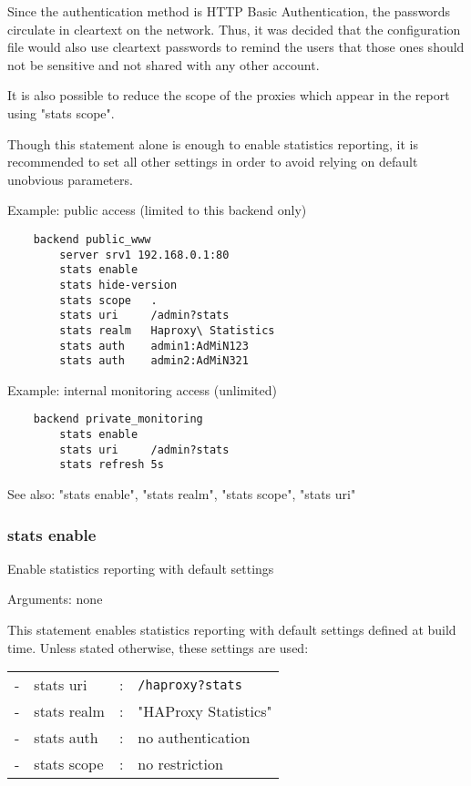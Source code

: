   Since the authentication method is HTTP Basic Authentication, the passwords
  circulate in cleartext on the network. Thus, it was decided that the
  configuration file would also use cleartext passwords to remind the users
  that those ones should not be sensitive and not shared with any other account.

  It is also possible to reduce the scope of the proxies which appear in the
  report using "stats scope".

  Though this statement alone is enough to enable statistics reporting, it is
  recommended to set all other settings in order to avoid relying on default
  unobvious parameters.

  Example: public access (limited to this backend only)
  \begin{verbatim}
    backend public_www
        server srv1 192.168.0.1:80
        stats enable
        stats hide-version
        stats scope   .
        stats uri     /admin?stats
        stats realm   Haproxy\ Statistics
        stats auth    admin1:AdMiN123
        stats auth    admin2:AdMiN321
   \end{verbatim}

   Example: internal monitoring access (unlimited)
   \begin{verbatim}
    backend private_monitoring
        stats enable
        stats uri     /admin?stats
        stats refresh 5s
   \end{verbatim}

  See also: "stats enable", "stats realm", "stats scope", "stats uri"

\subsubsection{stats enable}


  Enable statistics reporting with default settings


  Arguments: none

  This statement enables statistics reporting with default settings defined
  at build time. Unless stated otherwise, these settings are used:
  
  \begin{tabular}{llll}
  - & stats uri   & : & \verb|/haproxy?stats| \\
  - & stats realm & : & "HAProxy Statistics" \\
  - & stats auth  & : & no authentication \\
  - & stats scope & : & no restriction \\
  \end{tabular}

